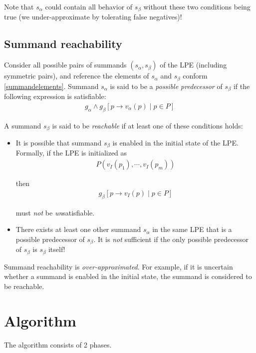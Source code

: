 Note that $s_\alpha$ could contain all behavior of $s_\beta$ without these two conditions being true (we under-approximate by tolerating false negatives)!

\subsection{Summand reachability}

Consider all possible pairs of summands $(s_\alpha, s_\beta)$ of the LPE (including symmetric pairs), and reference the elements of $s_\alpha$ and $s_\beta$ conform \ref{summandelements}.
Summand $s_\alpha$ is said to be a \emph{possible predecessor} of $s_\beta$ if the following expression is satisfiable:
\begin{align*}
g_\alpha \land {g_\beta}[p \rightarrow v_\alpha(p) \;|\; p \in P]
\end{align*}

A summand $s_\beta$ is said to be \emph{reachable} if at least one of these conditions holds:

\begin{itemize}
\item It is possible that summand $s_\beta$ is enabled in the initial state of the LPE.
Formally, if the LPE is initialized as
\begin{align*}
P(v_I(p_1), \cdots{}, v_I(p_m))
\end{align*}

then
\begin{align*}
g_\beta[p \rightarrow v_I(p) \;|\; p \in P]
\end{align*}

must \emph{not} be \emph{un}satisfiable.

\item There exists at least one other summand $s_\alpha$ in the same LPE that is a possible predecessor of $s_\beta$.
It is \emph{not} sufficient if the only possible predecessor of $s_\beta$ is $s_\beta$ itself!
\end{itemize}

Summand reachability is \emph{over-approximated}.
For example, if it is uncertain whether a summand is enabled in the initial state, the summand is considered to be reachable.

\section{Algorithm}

The algorithm consists of 2 phases.

